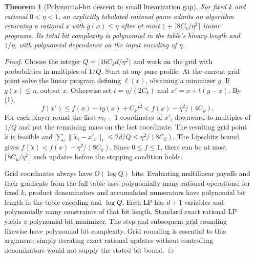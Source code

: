 \documentclass[11pt,a4paper]{article}
\newtheorem{theorem}{Theorem}
\begin{document}
\begin{theorem}[Polynomial-bit descent to small linearization gap]
For fixed $k$ and rational $0<\eta<1$, an explicitly tabulated rational game admits an algorithm returning a rational $x$ with $g(x)\leq\eta$ after at most $1+\lceil8C_k/\eta^2\rceil$ linear programs. Its total bit complexity is polynomial in the table's binary length and $1/\eta$, with polynomial dependence on the input encoding of $\eta$.
\end{theorem}
\begin{proof}
Choose the integer $Q=\lceil16C_kd/\eta^2\rceil$ and work on the grid with probabilities in multiples of $1/Q$. Start at any pure profile. At the current grid point solve the linear program defining $\ell(x)$, obtaining a minimizer $y$. If $g(x)\leq\eta$, output $x$. Otherwise set $t=\eta/(2C_k)$ and $x'=x+t(y-x)$.
By (1),
\[
 f(x')\leq f(x)-tg(x)+C_kt^2
           <f(x)-\eta^2/(4C_k).
\]
For each player round the first $m_i-1$ coordinates of $x'_i$ downward to multiples of $1/Q$ and put the remaining mass on the last coordinate. The resulting grid point $\widetilde x$ is feasible and
$\sum_i\|\widetilde x_i-x'_i\|_1\leq2d/Q\leq\eta^2/(8C_k)$.
The Lipschitz bound gives
$f(\widetilde x)<f(x)-\eta^2/(8C_k)$.
Since $0\leq f\leq1$, there can be at most $\lceil8C_k/\eta^2\rceil$ such updates before the stopping condition holds.

Grid coordinates always have $O(\log Q)$ bits. Evaluating multilinear payoffs and their gradients from the full table uses polynomially many rational operations; for fixed $k$, product denominators and accumulated numerators have polynomial bit length in the table encoding and $\log Q$. Each LP has $d+1$ variables and polynomially many constraints of that bit length. Standard exact rational LP yields a polynomial-bit minimizer. The step and subsequent grid rounding likewise have polynomial bit complexity. Grid rounding is essential to this argument: simply iterating exact rational updates without controlling denominators would not supply the stated bit bound.
\end{proof}
\end{document}
